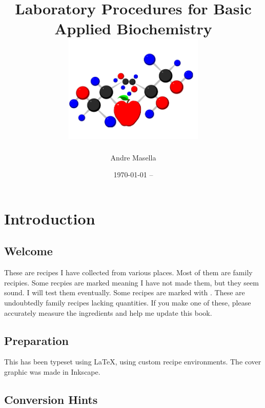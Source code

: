 \documentclass{book}
\begin{document}
\title{Laboratory Procedures for Basic Applied Biochemistry \\
\includegraphics[width=0.5\textwidth,angle=-90]{CoverLogo} 
}
\author{ Andre Masella }
\date{\today{} -- }
\maketitle

\tableofcontents

\chapter{ Introduction }

\section { Welcome }

These are recipes I have collected from various places. Most of them are
family recipies. Some recpies are marked \UNTESTED meaning I have not
made them, but they seem sound.  I will test them eventually. Some recipes are marked with \FIXME{}. These are undoubtedly family recipes lacking quantities. If you make one of these, please accurately measure the ingredients and help me update this book.\par

\section { Preparation }

This has been typeset using \LaTeX{}, using custom recipe environments.
The cover graphic was made in Inkscape.\par

\section { Conversion Hints }
\end{document}
